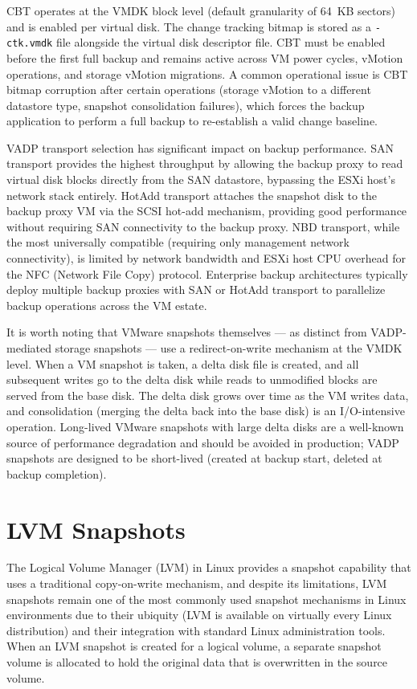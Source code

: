 CBT operates at the VMDK block level (default granularity of 64~KB sectors) and is enabled per virtual disk. The change tracking bitmap is stored as a \texttt{-ctk.vmdk} file alongside the virtual disk descriptor file. CBT must be enabled before the first full backup and remains active across VM power cycles, vMotion operations, and storage vMotion migrations. A common operational issue is CBT bitmap corruption after certain operations (storage vMotion to a different datastore type, snapshot consolidation failures), which forces the backup application to perform a full backup to re-establish a valid change baseline.

VADP transport selection has significant impact on backup performance. SAN transport provides the highest throughput by allowing the backup proxy to read virtual disk blocks directly from the SAN datastore, bypassing the ESXi host's network stack entirely. HotAdd transport attaches the snapshot disk to the backup proxy VM via the SCSI hot-add mechanism, providing good performance without requiring SAN connectivity to the backup proxy. NBD transport, while the most universally compatible (requiring only management network connectivity), is limited by network bandwidth and ESXi host CPU overhead for the NFC (Network File Copy) protocol. Enterprise backup architectures typically deploy multiple backup proxies with SAN or HotAdd transport to parallelize backup operations across the VM estate.

It is worth noting that VMware snapshots themselves --- as distinct from VADP-mediated storage snapshots --- use a redirect-on-write mechanism at the VMDK level. When a VM snapshot is taken, a delta disk file is created, and all subsequent writes go to the delta disk while reads to unmodified blocks are served from the base disk. The delta disk grows over time as the VM writes data, and consolidation (merging the delta back into the base disk) is an I/O-intensive operation. Long-lived VMware snapshots with large delta disks are a well-known source of performance degradation and should be avoided in production; VADP snapshots are designed to be short-lived (created at backup start, deleted at backup completion).

\section{LVM Snapshots}

The Logical Volume Manager (LVM) in Linux provides a snapshot capability that uses a traditional copy-on-write mechanism, and despite its limitations, LVM snapshots remain one of the most commonly used snapshot mechanisms in Linux environments due to their ubiquity (LVM is available on virtually every Linux distribution) and their integration with standard Linux administration tools. When an LVM snapshot is created for a logical volume, a separate snapshot volume is allocated to hold the original data that is overwritten in the source volume.

